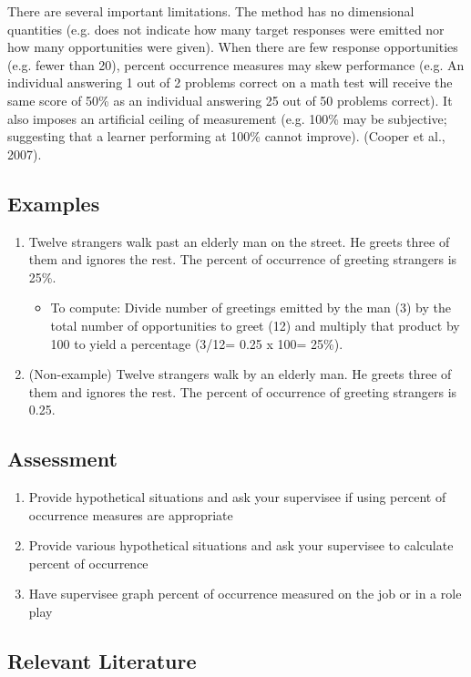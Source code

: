 There are several important limitations. The method has no dimensional quantities (e.g. does not indicate how many target responses were emitted nor how many opportunities were given). When there are few response opportunities (e.g. fewer than 20), percent occurrence measures may skew performance (e.g. An individual  answering 1 out of 2 problems correct on a math test will receive the same score of 50\% as an individual answering 25 out of 50 problems correct). It also imposes an artificial ceiling of measurement (e.g. 100\% may be subjective; suggesting that a learner performing at 100\% cannot improve). (Cooper et al., 2007).

\subsection{Examples}
\begin{enumerate}
\item  Twelve strangers walk past an elderly man on the street. He greets three of them and ignores the rest. The percent of occurrence of greeting strangers is 25\%.
\begin{itemize}
\item To compute: Divide number of greetings emitted by the man (3) by the total number of opportunities to greet (12) and multiply that product by 100 to yield a percentage (3/12= 0.25 x 100= 25\%).
\end{itemize}
\item (Non-example) Twelve strangers walk by an elderly man. He greets three of them and ignores the rest. The percent of occurrence of greeting strangers is 0.25. 
\end{enumerate}
%
\subsection{Assessment}
\begin{enumerate}
\item Provide hypothetical situations and ask your supervisee if using percent of occurrence measures are appropriate
\item Provide various hypothetical situations and ask your supervisee to calculate percent of occurrence
\item Have supervisee graph percent of occurrence measured on the job or in a role play
\end{enumerate}
%
\subsection{Relevant Literature}
\begin{refsection}
\nocite{cooper2007applied}
\printbibliography[heading=none]
\end{refsection}
%
